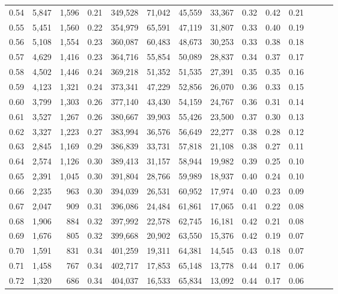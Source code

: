 \begin{tabular}{rrrrrrrrrrrrrr}
0.54 &  5,847 &  1,596 &  0.21 &  349,528 &   71,042 &  45,559 &  33,367 &  0.32 &  0.42 &      0.21 \\
0.55 &  5,451 &  1,560 &  0.22 &  354,979 &   65,591 &  47,119 &  31,807 &  0.33 &  0.40 &      0.19 \\
0.56 &  5,108 &  1,554 &  0.23 &  360,087 &   60,483 &  48,673 &  30,253 &  0.33 &  0.38 &      0.18 \\
0.57 &  4,629 &  1,416 &  0.23 &  364,716 &   55,854 &  50,089 &  28,837 &  0.34 &  0.37 &      0.17 \\
0.58 &  4,502 &  1,446 &  0.24 &  369,218 &   51,352 &  51,535 &  27,391 &  0.35 &  0.35 &      0.16 \\
0.59 &  4,123 &  1,321 &  0.24 &  373,341 &   47,229 &  52,856 &  26,070 &  0.36 &  0.33 &      0.15 \\
0.60 &  3,799 &  1,303 &  0.26 &  377,140 &   43,430 &  54,159 &  24,767 &  0.36 &  0.31 &      0.14 \\
0.61 &  3,527 &  1,267 &  0.26 &  380,667 &   39,903 &  55,426 &  23,500 &  0.37 &  0.30 &      0.13 \\
0.62 &  3,327 &  1,223 &  0.27 &  383,994 &   36,576 &  56,649 &  22,277 &  0.38 &  0.28 &      0.12 \\
0.63 &  2,845 &  1,169 &  0.29 &  386,839 &   33,731 &  57,818 &  21,108 &  0.38 &  0.27 &      0.11 \\
0.64 &  2,574 &  1,126 &  0.30 &  389,413 &   31,157 &  58,944 &  19,982 &  0.39 &  0.25 &      0.10 \\
0.65 &  2,391 &  1,045 &  0.30 &  391,804 &   28,766 &  59,989 &  18,937 &  0.40 &  0.24 &      0.10 \\
0.66 &  2,235 &    963 &  0.30 &  394,039 &   26,531 &  60,952 &  17,974 &  0.40 &  0.23 &      0.09 \\
0.67 &  2,047 &    909 &  0.31 &  396,086 &   24,484 &  61,861 &  17,065 &  0.41 &  0.22 &      0.08 \\
0.68 &  1,906 &    884 &  0.32 &  397,992 &   22,578 &  62,745 &  16,181 &  0.42 &  0.21 &      0.08 \\
0.69 &  1,676 &    805 &  0.32 &  399,668 &   20,902 &  63,550 &  15,376 &  0.42 &  0.19 &      0.07 \\
0.70 &  1,591 &    831 &  0.34 &  401,259 &   19,311 &  64,381 &  14,545 &  0.43 &  0.18 &      0.07 \\
0.71 &  1,458 &    767 &  0.34 &  402,717 &   17,853 &  65,148 &  13,778 &  0.44 &  0.17 &      0.06 \\
0.72 &  1,320 &    686 &  0.34 &  404,037 &   16,533 &  65,834 &  13,092 &  0.44 &  0.17 &      0.06 \\

\end{tabular}
